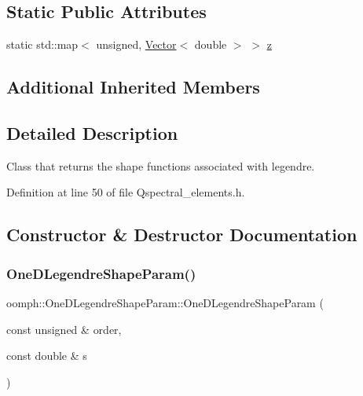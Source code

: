 \subsection*{Static Public Attributes}
\begin{DoxyCompactItemize}
\item 
static std\+::map$<$ unsigned, \hyperlink{classoomph_1_1Vector}{Vector}$<$ double $>$ $>$ \hyperlink{classoomph_1_1OneDLegendreShapeParam_a74cb7131a47cc15dc79d25af12a13950}{z}
\end{DoxyCompactItemize}
\subsection*{Additional Inherited Members}


\subsection{Detailed Description}
Class that returns the shape functions associated with legendre. 

Definition at line 50 of file Qspectral\+\_\+elements.\+h.



\subsection{Constructor \& Destructor Documentation}
\mbox{\label{classoomph_1_1OneDLegendreShapeParam_adb7ae440a08c6d7815eb52250a5564fe}} 
\subsubsection{\texorpdfstring{One\+D\+Legendre\+Shape\+Param()}{OneDLegendreShapeParam()}}
{\footnotesize\ttfamily oomph\+::\+One\+D\+Legendre\+Shape\+Param\+::\+One\+D\+Legendre\+Shape\+Param (\begin{DoxyParamCaption}\item[{const unsigned \&}]{order,  }\item[{const double \&}]{s }\end{DoxyParamCaption})\hspace{0.3cm}{\ttfamily [inline]}}



